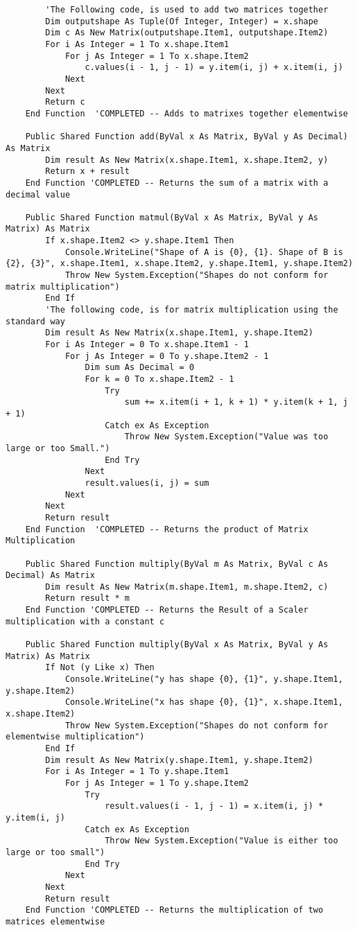 \begin{verbatim}
        'The Following code, is used to add two matrices together
        Dim outputshape As Tuple(Of Integer, Integer) = x.shape
        Dim c As New Matrix(outputshape.Item1, outputshape.Item2)
        For i As Integer = 1 To x.shape.Item1
            For j As Integer = 1 To x.shape.Item2
                c.values(i - 1, j - 1) = y.item(i, j) + x.item(i, j)
            Next
        Next
        Return c
    End Function  'COMPLETED -- Adds to matrixes together elementwise

    Public Shared Function add(ByVal x As Matrix, ByVal y As Decimal) As Matrix
        Dim result As New Matrix(x.shape.Item1, x.shape.Item2, y)
        Return x + result
    End Function 'COMPLETED -- Returns the sum of a matrix with a decimal value

    Public Shared Function matmul(ByVal x As Matrix, ByVal y As Matrix) As Matrix
        If x.shape.Item2 <> y.shape.Item1 Then
            Console.WriteLine("Shape of A is {0}, {1}. Shape of B is {2}, {3}", x.shape.Item1, x.shape.Item2, y.shape.Item1, y.shape.Item2)
            Throw New System.Exception("Shapes do not conform for matrix multiplication")
        End If
        'The following code, is for matrix multiplication using the standard way
        Dim result As New Matrix(x.shape.Item1, y.shape.Item2)
        For i As Integer = 0 To x.shape.Item1 - 1
            For j As Integer = 0 To y.shape.Item2 - 1
                Dim sum As Decimal = 0
                For k = 0 To x.shape.Item2 - 1
                    Try
                        sum += x.item(i + 1, k + 1) * y.item(k + 1, j + 1)
                    Catch ex As Exception
                        Throw New System.Exception("Value was too large or too Small.")
                    End Try
                Next
                result.values(i, j) = sum
            Next
        Next
        Return result
    End Function  'COMPLETED -- Returns the product of Matrix Multiplication

    Public Shared Function multiply(ByVal m As Matrix, ByVal c As Decimal) As Matrix
        Dim result As New Matrix(m.shape.Item1, m.shape.Item2, c)
        Return result * m
    End Function 'COMPLETED -- Returns the Result of a Scaler multiplication with a constant c

    Public Shared Function multiply(ByVal x As Matrix, ByVal y As Matrix) As Matrix
        If Not (y Like x) Then
            Console.WriteLine("y has shape {0}, {1}", y.shape.Item1, y.shape.Item2)
            Console.WriteLine("x has shape {0}, {1}", x.shape.Item1, x.shape.Item2)
            Throw New System.Exception("Shapes do not conform for elementwise multiplication")
        End If
        Dim result As New Matrix(y.shape.Item1, y.shape.Item2)
        For i As Integer = 1 To y.shape.Item1
            For j As Integer = 1 To y.shape.Item2
                Try
                    result.values(i - 1, j - 1) = x.item(i, j) * y.item(i, j)
                Catch ex As Exception
                    Throw New System.Exception("Value is either too large or too small")
                End Try
            Next
        Next
        Return result
    End Function 'COMPLETED -- Returns the multiplication of two matrices elementwise


\end{verbatim}
